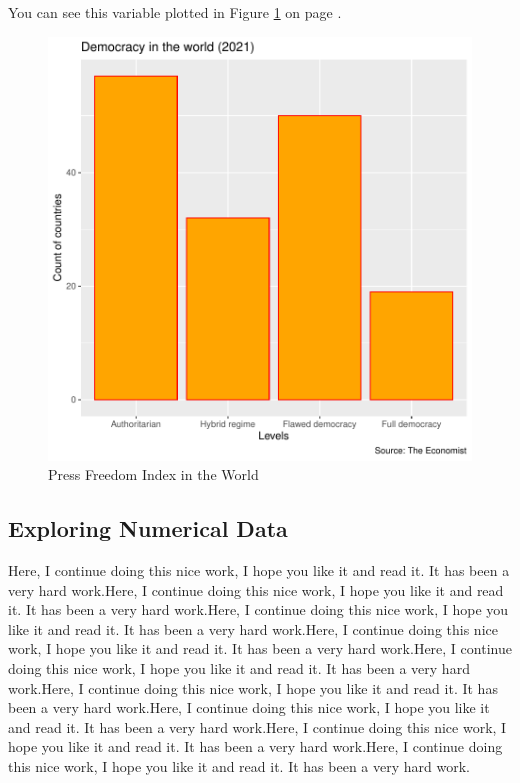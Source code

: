 \documentclass[a4paper, 12pt]{article}
\begin{document}

You can see this variable plotted in Figure \ref{catBarplot} on page \pageref{catBarplot}.


\begin{figure}[h]
\centering
\begin{adjustbox}{width=7cm,height=5cm} %
\includegraphics{WorkInR_forPrinter-catBarplot}
\end{adjustbox}
\caption{Press Freedom Index in the World}  %
\label{catBarplot} %
\end{figure}



\subsection{Exploring Numerical Data}\label{numexplo}

Here, I continue doing this nice work, I hope you like it and read it. It has been a very hard work.Here, I continue doing this nice work, I hope you like it and read it. It has been a very hard work.Here, I continue doing this nice work, I hope you like it and read it. It has been a very hard work.Here, I continue doing this nice work, I hope you like it and read it. It has been a very hard work.Here, I continue doing this nice work, I hope you like it and read it. It has been a very hard work.Here, I continue doing this nice work, I hope you like it and read it. It has been a very hard work.Here, I continue doing this nice work, I hope you like it and read it. It has been a very hard work.Here, I continue doing this nice work, I hope you like it and read it. It has been a very hard work.Here, I continue doing this nice work, I hope you like it and read it. It has been a very hard work.
\end{document}
